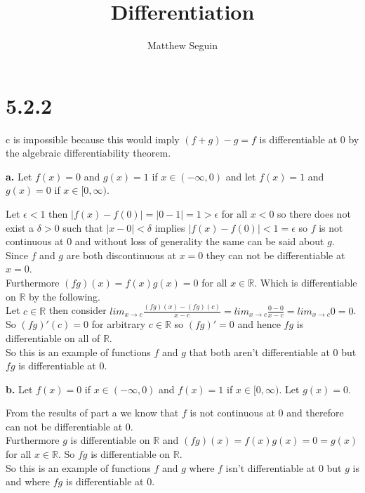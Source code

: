 \documentclass{article}
\title{Differentiation}
\author{Matthew Seguin}
\date{}
\begin{document}
\maketitle


\section*{5.2.2}
\doublespacing
\begin{center}
    c is impossible because this would imply $(f + g) - g = f$ is differentiable at 0 by the algebraic differentiability theorem.
\end{center}

{\Large\textbf{a.}} Let $f(x) = 0$ and $g(x) = 1$ if $x\in (-\infty , 0)$ and let $f(x) = 1$ and $g(x) = 0$ if $x\in [0,\infty )$.
\begin{center}
    Let $\epsilon < 1$ then $|f(x) - f(0)| = |0 - 1| = 1 >\epsilon$ for all $x < 0$ so there does not exist a $\delta > 0$ such that $|x - 0| <\delta$ implies $|f(x) - f(0)| < 1 =\epsilon$ so $f$ is not continuous at 0 and without loss of generality the same can be said about $g$.
    \\Since $f$ and $g$ are both discontinuous at $x = 0$ they can not be differentiable at $x = 0$.
    \\Furthermore $(fg)(x) = f(x) g(x) = 0$ for all $x\in\mathbb{R}$. Which is differentiable on $\mathbb{R}$ by the following.
    \\Let $c\in\mathbb{R}$ then consider $lim_{x\rightarrow c}\frac{(fg)(x) - (fg)(c)}{x - c} = lim_{x\rightarrow c}\frac{0 - 0}{x - c} = lim_{x\rightarrow c} 0 = 0$.
    \\So $(fg)' (c) = 0$ for arbitrary $c\in\mathbb{R}$ so $(fg)' = 0$ and hence $fg$ is differentiable on all of $\mathbb{R}$.
    \\So this is an example of functions $f$ and $g$ that both aren't differentiable at 0 but $fg$ is differentiable at 0.
\end{center}

{\Large\textbf{b.}} Let $f(x) = 0$ if $x\in (-\infty , 0)$ and $f(x) = 1$ if $x\in [0,\infty )$. Let $g(x) = 0$.
\begin{center}
    From the results of part a we know that $f$ is not continuous at 0 and therefore can not be differentiable at 0.
    \\Furthermore $g$ is differentiable on $\mathbb{R}$ and $(fg) (x) = f(x) g(x) = 0 = g(x)$ for all $x\in\mathbb{R}$. So $fg$ is differentiable on $\mathbb{R}$.
    \\So this is an example of functions $f$ and $g$ where $f$ isn't differentiable at 0 but $g$ is and where $fg$ is differentiable at 0.
\end{center}
\end{document}
